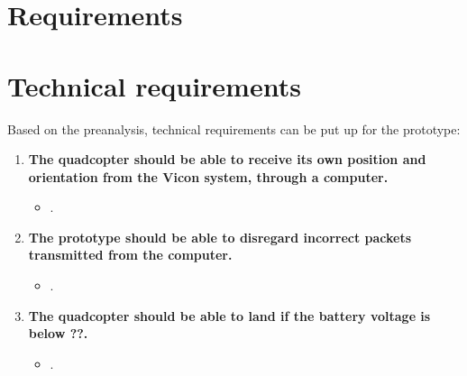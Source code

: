 \chapter{Requirements}
\chapter{Technical requirements}
\label{ch:technicalRequirements}
Based on the preanalysis, technical requirements can be put up for the prototype:
\begin{enumerate}[label=\textbf{\arabic*})]

\item \textbf{The quadcopter should be able to receive its own position and orientation from the Vicon system, through a computer.}
\begin{itemize}
\item[]  .
\end{itemize}

\item \textbf{The prototype should be able to disregard incorrect packets transmitted from the computer.}
\begin{itemize}
\item[] .
\end{itemize}

\item \textbf{The quadcopter should be able to land if the battery voltage is below ??.}
\begin{itemize}
\item[] .
\end{itemize}


\end{enumerate}
